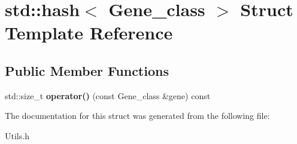\hypertarget{structstd_1_1hash_3_01Gene__class_01_4}{}\section{std\+:\+:hash$<$ Gene\+\_\+class $>$ Struct Template Reference}
\label{structstd_1_1hash_3_01Gene__class_01_4}
\subsection*{Public Member Functions}
\begin{DoxyCompactItemize}
\item 
\mbox{\label{structstd_1_1hash_3_01Gene__class_01_4_a5fc3986cae63903a826c947fec65bf53}} 
std\+::size\+\_\+t {\bfseries operator()} (const Gene\+\_\+class \&gene) const
\end{DoxyCompactItemize}


The documentation for this struct was generated from the following file\+:\begin{DoxyCompactItemize}
\item 
Utils.\+h\end{DoxyCompactItemize}
